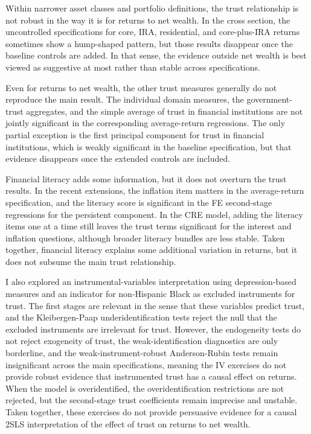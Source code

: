 \par Within narrower asset classes and portfolio definitions, the trust relationship is not robust in the way it is for returns to net wealth. In the cross section, the uncontrolled specifications for core, IRA, residential, and core-plus-IRA returns sometimes show a hump-shaped pattern, but those results disappear once the baseline controls are added. In that sense, the evidence outside net wealth is best viewed as suggestive at most rather than stable across specifications.

\par Even for returns to net wealth, the other trust measures generally do not reproduce the main result. The individual domain measures, the government-trust aggregates, and the simple average of trust in financial institutions are not jointly significant in the corresponding average-return regressions. The only partial exception is the first principal component for trust in financial institutions, which is weakly significant in the baseline specification, but that evidence disappears once the extended controls are included.

\par Financial literacy adds some information, but it does not overturn the trust results. In the recent extensions, the inflation item matters in the average-return specification, and the literacy score is significant in the FE second-stage regressions for the persistent component. In the CRE model, adding the literacy items one at a time still leaves the trust terms significant for the interest and inflation questions, although broader literacy bundles are less stable. Taken together, financial literacy explains some additional variation in returns, but it does not subsume the main trust relationship.

\par I also explored an instrumental-variables interpretation using depression-based measures and an indicator for non-Hispanic Black as excluded instruments for trust. The first stages are relevant in the sense that these variables predict trust, and the Kleibergen-Paap underidentification tests reject the null that the excluded instruments are irrelevant for trust. However, the endogeneity tests do not reject exogeneity of trust, the weak-identification diagnostics are only borderline, and the weak-instrument-robust Anderson-Rubin tests remain insignificant across the main specifications, meaning the IV exercises do not provide robust evidence that instrumented trust has a causal effect on returns. When the model is overidentified, the overidentification restrictions are not rejected, but the second-stage trust coefficients remain imprecise and unstable. Taken together, these exercises do not provide persuasive evidence for a causal 2SLS interpretation of the effect of trust on returns to net wealth.
